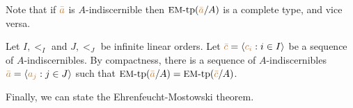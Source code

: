 Note that if ${\color{brown}\bar a}$ is $A$-indiscernible then $\mbox{{\small EM}-tp}({\color{brown}\bar a}/A)$ is a complete type,
and vice versa.

\begin{remark}
  Let $I,<_I$ and $J,<_J$ be infinite linear orders.
  Let ${\color{brown}\bar c}=\langle{\color{brown}c_i}:i\in I\rangle$ be a sequence of $A$-indiscernibles.
  By compactness, there is a sequence of $A$-indiscernibles ${\color{brown}\bar a}=\langle{\color{brown}a_j}:j\in J\rangle$ such that $\mbox{{\small EM}-tp}({\color{brown}\bar a}/A)=\mbox{{\small EM}-tp}({\color{brown}\bar c}/A)$.
\end{remark}


Finally, we can state the Ehrenfeucht-Mostowski theorem.

